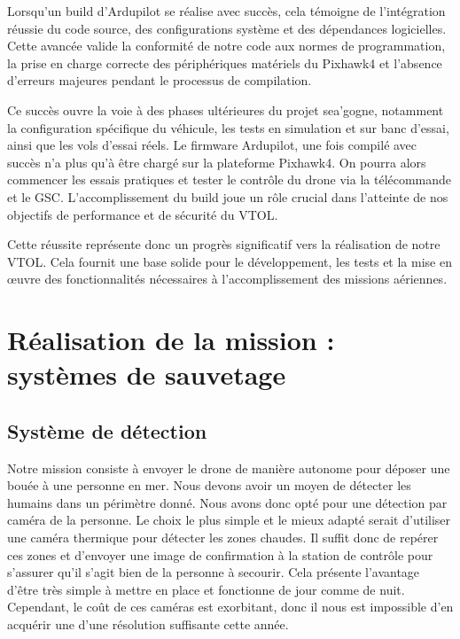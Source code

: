 \documentclass[a4paper,12pt,french]{report}
\begin{document}
Lorsqu'un build d'Ardupilot se réalise avec succès, cela témoigne de l'intégration réussie du code source, des configurations système et des dépendances logicielles. Cette avancée valide la conformité de notre code aux normes de programmation, la prise en charge correcte des périphériques matériels du Pixhawk4 et l'absence d'erreurs majeures pendant le processus de compilation.\newline

Ce succès ouvre la voie à des phases ultérieures du projet sea’gogne, notamment la configuration spécifique du véhicule, les tests en simulation et sur banc d'essai, ainsi que les vols d'essai réels. Le firmware Ardupilot, une fois compilé avec succès n’a plus qu’à être chargé sur la plateforme Pixhawk4. On pourra alors commencer les essais pratiques et tester le contrôle du drone via la télécommande et le GSC. L’accomplissement du build joue un rôle crucial dans l'atteinte de nos objectifs de performance et de sécurité du VTOL.\newline

Cette réussite représente donc un progrès significatif vers la réalisation de notre VTOL. Cela fournit une base solide pour le développement, les tests et la mise en œuvre des fonctionnalités nécessaires à l'accomplissement des missions aériennes.


\chapter{Réalisation de la mission : systèmes de sauvetage}

\section{Système de détection}

Notre mission consiste à envoyer le drone de manière autonome pour déposer une bouée à une personne en mer. Nous devons avoir un moyen de détecter les humains dans un périmètre donné. Nous avons donc opté pour une détection par caméra de la personne. Le choix le plus simple et le mieux adapté serait d'utiliser une caméra thermique pour détecter les zones chaudes. Il suffit donc de repérer ces zones et d'envoyer une image de confirmation à la station de contrôle pour s'assurer qu'il s'agit bien de la personne à secourir. Cela présente l'avantage d'être très simple à mettre en place et fonctionne de jour comme de nuit. Cependant, le coût de ces caméras est exorbitant, donc il nous est impossible d'en acquérir une d'une résolution suffisante cette année.\newline
\end{document}
